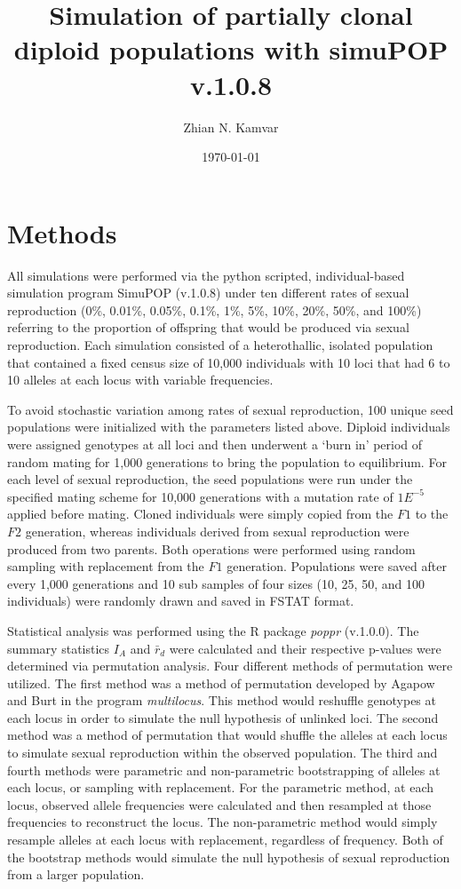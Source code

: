 \documentclass[letterpaper, 10pt]{article}
\title{Simulation of partially clonal diploid populations with simuPOP v.1.0.8}
\author{Zhian N. Kamvar}
\date{\today}
\newcommand{\tab}{\hspace*{1.5em}}
\begin{document}
\maketitle
\linenumbers
{}
\section{Methods}
\tab All simulations were performed via the python scripted, individual-based simulation program SimuPOP (v.1.0.8) under ten different rates of sexual reproduction (0\%, 0.01\%, 0.05\%, 0.1\%, 1\%, 5\%, 10\%, 20\%, 50\%, and 100\%) referring to the proportion of offspring that would be produced via sexual reproduction. 
Each simulation consisted of a heterothallic, isolated population that contained a fixed census size of 10,000 individuals with 10 loci that had 6 to 10 alleles at each locus with variable frequencies. 

To avoid stochastic variation among rates of sexual reproduction, 100 unique seed populations were initialized with the parameters listed above.
Diploid individuals were assigned genotypes at all loci and then underwent a `burn in' period of random mating for 1,000 generations to bring the population to equilibrium. 
For each level of sexual reproduction, the seed populations were run under the specified mating scheme for 10,000 generations with a mutation rate of $1E^{-5}$ applied before mating. 
Cloned individuals were simply copied from the $F1$ to the $F2$ generation, whereas individuals derived from sexual reproduction were produced from two parents. Both operations were performed using random sampling with replacement from the $F1$ generation.
Populations were saved after every 1,000 generations and 10 sub samples of four sizes (10, 25, 50, and 100 individuals) were randomly drawn and saved in FSTAT format. 

Statistical analysis was performed using the R package \textit{poppr} (v.1.0.0). 
The summary statistics $I_A$ and $\bar{r}_d$ were calculated and their respective p-values were determined via permutation analysis.
Four different methods of permutation were utilized.
The first method was a method of permutation developed by Agapow and Burt in the program \textit{multilocus}.
This method would reshuffle genotypes at each locus in order to simulate the null hypothesis of unlinked loci. 
The second method was a method of permutation that would shuffle the alleles at each locus to simulate sexual reproduction within the observed population.
The third and fourth methods were parametric and non-parametric bootstrapping of alleles at each locus, or sampling with replacement. 
For the parametric method, at each locus, observed allele frequencies were calculated and then resampled at those frequencies to reconstruct the locus. 
The non-parametric method would simply resample alleles at each locus with replacement, regardless of frequency.
Both of the bootstrap methods would simulate the null hypothesis of sexual reproduction from a larger population. 
\end{document}
